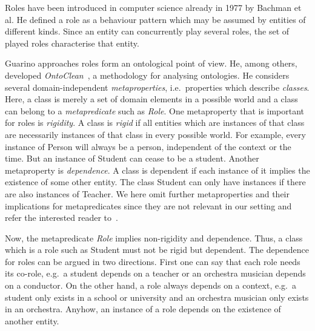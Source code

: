 Roles have been introduced in computer science already in 1977 by Bachman et al. He defined a role
as a behaviour pattern which may be assumed by entities of different kinds. Since an entity can
concurrently play several roles, the set of played roles characterise that entity.

Guarino approaches roles form an ontological point of view. He, among others, developed
\emph{OntoClean}~\cite{GuW-HoO09}, a methodology for analysing ontologies. He considers several
domain-independent \emph{metaproperties}, i.e.\ properties which describe \emph{classes}. Here, a
class is merely a set of domain elements in a possible world and a class can belong to a
\emph{metapredicate} such as \emph{Role}.
%
One metaproperty that is important for roles is \emph{rigidity}. A class is \emph{rigid} if all
entities which are instances of that class are necessarily instances of that class in every possible
world. For example, every instance of Person will always be a person, independent of the context or
the time. But an instance of Student can cease to be a student.
%
Another metaproperty is \emph{dependence}.  A class is dependent if each instance of it implies the
existence of some other entity. The class Student can only have instances if there are also
instances of Teacher.
%
We here omit further metaproperties and their implications for metapredicates since they are not
relevant in our setting and refer the interested reader
to~\cite{GuW-EKAW00,GuW00,GuW-CM00,WeG-DKE01}.

Now, the metapredicate \emph{Role} implies non-rigidity and dependence. Thus, a class which is a
role such as Student must not be rigid but dependent. The dependence for roles can be argued in two
directions. First one can say that each role needs its co-role, e.g.\ a student depends on a teacher
or an orchestra musician depends on a conductor. On the other hand, a role always depends on a
context, e.g.\ a student only exists in a school or university and an orchestra musician only exists
in an orchestra.  Anyhow, an instance of a role depends on the existence of another entity.


